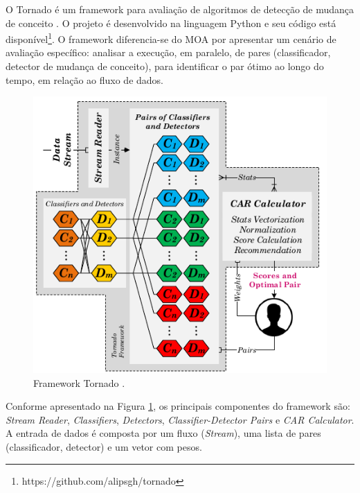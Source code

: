 \documentclass[qual, classic, a4paper]{ufbathesis}
\begin{document}
O Tornado é um framework para avaliação de algoritmos de detecção de mudança de conceito \cite{Pesaranghader:Tornado}.
O projeto é desenvolvido na linguagem Python e seu código está disponível\footnote{https://github.com/alipsgh/tornado}.
O framework diferencia-se do MOA por apresentar um cenário de avaliação específico: 
analisar a execução, em paralelo, de pares (classificador, detector de mudança de conceito), 
para identificar o par ótimo ao longo do tempo, em relação ao fluxo de dados.

\begin{figure}[H]
\begin{center}
    \includegraphics[scale=0.75]{imagens/tornado.png}
    \caption{Framework Tornado \cite{Pesaranghader:Tornado}.}
    \label{fig:tornado}
\end{center}
\end{figure}

Conforme apresentado na Figura \ref{fig:tornado}, os principais componentes do framework são: 
\textit{Stream Reader}, \textit{Classifiers}, \textit{Detectors}, \textit{Classifier-Detector Pairs} e \textit{CAR Calculator}.
A entrada de dados é composta por um fluxo (\textit{Stream}), uma lista de pares (classificador, detector) e um vetor com pesos.
\end{document}
